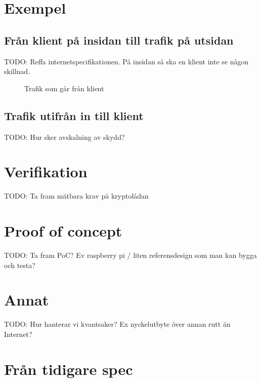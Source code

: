 \documentclass[12pt,a4paper]{article}
\begin{document}
\section{Exempel}\label{exempel}

\subsection{Från klient på insidan till trafik på
utsidan}\label{fruxe5n-klient-puxe5-insidan-till-trafik-puxe5-utsidan}

TODO: Reffa internetspecifikationen. På insidan så ska en klient inte se
någon skillnad.

\begin{figure}
\centering

\caption{Trafik som går från klient}
\end{figure}

\subsection{Trafik utifrån in till
klient}\label{trafik-utifruxe5n-in-till-klient}

TODO: Hur sker avskalning av skydd?

\section{Verifikation}\label{verifikation}

TODO: Ta fram mätbara krav på kryptolådan

\section{Proof of concept}\label{proof-of-concept-1}

TODO: Ta fram PoC? Ev raspberry pi / liten referensdesign som man kan
bygga och testa?

\section{Annat}\label{annat}

TODO: Hur hanterar vi kvantsaker? Ex nyckelutbyte över annan rutt än
Internet?

\section{Från tidigare spec}\label{fruxe5n-tidigare-spec}
\end{document}
